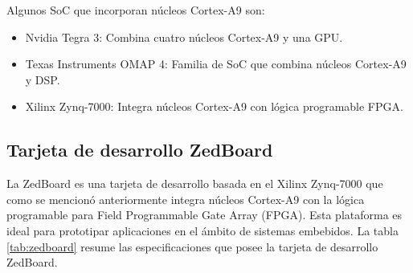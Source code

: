 Algunos SoC que incorporan núcleos Cortex-A9 son:

\begin{itemize}
    \item Nvidia Tegra 3: Combina cuatro núcleos Cortex-A9 y una GPU.
    \item Texas Instruments OMAP 4: Familia de SoC que combina núcleos Cortex-A9 y DSP.
    \item Xilinx Zynq-7000: Integra núcleos Cortex-A9 con lógica programable FPGA.
\end{itemize}

\subsection{Tarjeta de desarrollo ZedBoard}

La ZedBoard es una tarjeta de desarrollo basada en el Xilinx Zynq-7000 que como se mencionó anteriormente integra núcleos Cortex-A9 con la lógica programable 
para Field Programmable Gate Array (FPGA). Esta plataforma es ideal para prototipar aplicaciones en el ámbito de sistemas embebidos. La tabla \ref{tab:zedboard} 
resume las especificaciones que posee la tarjeta de desarrollo ZedBoard.


